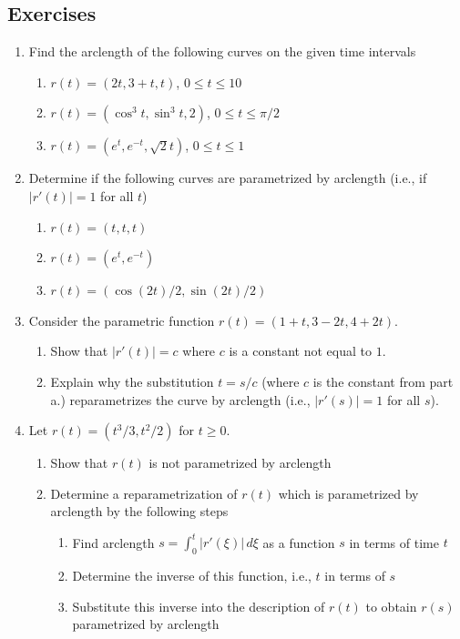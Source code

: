 \documentclass[12pt]{article}
\numberwithin{equation}{subsection}
\numberwithin{figure}{subsection}
\theoremstyle{note}
\begin{document}
{\subsection{Exercises} 
 
 \begin{enumerate}[label=\arabic*.]
\item Find the arclength of the following curves on the given time intervals
\begin{enumerate}
	\item $r(t)=(2t, 3+t, t)$, $0\leq t\leq 10$
	\item $r(t)=(\cos^3t,\sin^3 t,2)$, $0\leq t\leq \pi/2$
	\item $r(t)=(e^t, e^{-t}, \sqrt{2}t)$, $0\leq t\leq 1$
\end{enumerate}

\item Determine if the following curves are parametrized by arclength (i.e., if $|r'(t)|=1$ for all $t$)

\begin{enumerate}	
	\item $r(t)=(t,t,t)$
	\item $r(t)=(e^t, e^{-t})$
	\item $r(t)=(\cos(2t)/2, \sin(2t)/2)$
\end{enumerate}


\item Consider the parametric function $r(t)=(1+t, 3-2t, 4+2t)$.

\begin{enumerate}
	\item Show that $|r'(t)|=c$ where $c$ is a constant not equal to $1$.
	\item Explain why the substitution $t=s/c$ (where $c$ is the constant from part a.) reparametrizes the curve by arclength (i.e., $|r'(s)|=1$ for all $s$).
\end{enumerate}


\item Let $r(t)=(t^3/3, t^2/2)$ for $t\geq 0$. 

\begin{enumerate}
	\item Show that $r(t)$ is not parametrized by arclength
	\item Determine a reparametrization of $r(t)$ which is parametrized by arclength by the following steps
		\begin{enumerate}[label=\roman*.]
			\item Find arclength  $s=\displaystyle \int_0^{t} |r'(\xi)|\, d\xi$ as a function $s$ in terms of time $t$
			\item Determine the inverse of this function, i.e., $t$ in terms of $s$
			\item Substitute this inverse into the description of $r(t)$ to obtain $r(s)$ parametrized by arclength
		\end{enumerate}
\end{enumerate}


\end{enumerate}}
\end{document}
